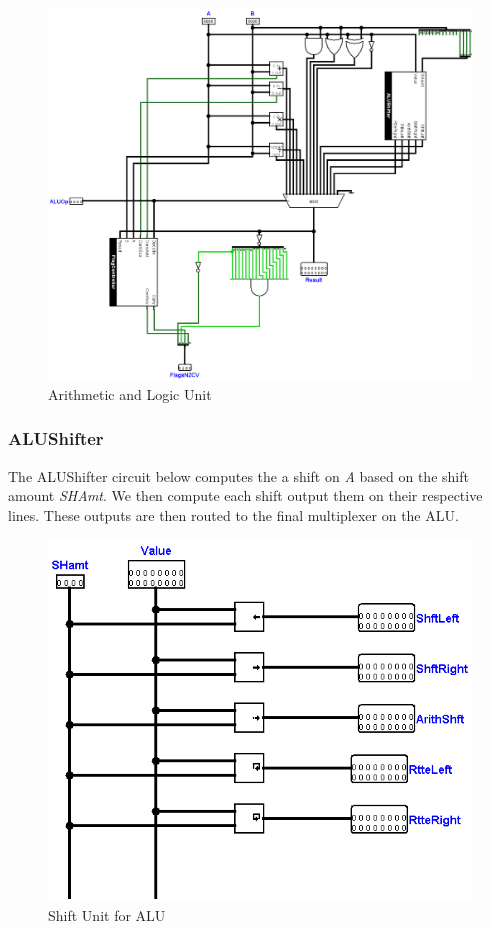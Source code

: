 \documentclass[12pt, letter]{article}
\begin{document}
	\newpage 
	\begin{figure}[t]
		\centering
		\includegraphics[scale = 0.3]{ALU}
		\caption{Arithmetic and Logic Unit}
		\label{fig:ALU}
	\end{figure}
	
	\subsubsection{ALUShifter}
	
	The ALUShifter circuit below computes the a shift on \textit{A} based on the shift amount \textit{SHAmt}. We then compute each shift output them on their respective lines. These outputs are then routed to the final multiplexer on the ALU. 
	
	\begin{figure}[h]
		\centering
		\includegraphics[scale = 0.25]{ALUShifter}
		\caption{Shift Unit for ALU}
		\label{fig:ALUShifter}
	\end{figure}
\end{document}
